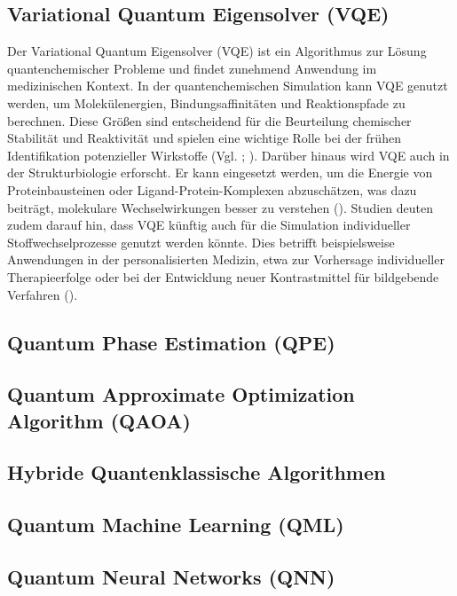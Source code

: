 \subsection{Variational Quantum Eigensolver (VQE)}
Der Variational Quantum Eigensolver (VQE) ist ein Algorithmus zur Lösung quantenchemischer Probleme und findet zunehmend Anwendung im medizinischen Kontext. In der quantenchemischen Simulation kann VQE genutzt werden, um Molekülenergien, Bindungsaffinitäten und Reaktionspfade zu berechnen. Diese Größen sind entscheidend für die Beurteilung chemischer Stabilität und Reaktivität und spielen eine wichtige Rolle bei der frühen Identifikation potenzieller Wirkstoffe (Vgl. \cite{palFuturePotentialQuantum2024}; \cite{cao_quantum_2019}). Darüber hinaus wird VQE auch in der Strukturbiologie erforscht. Er kann eingesetzt werden, um die Energie von Proteinbausteinen oder Ligand-Protein-Komplexen abzuschätzen, was dazu beiträgt, molekulare Wechselwirkungen besser zu verstehen (\cite{marchettiQuantumComputingAlgorithms2022}). Studien deuten zudem darauf hin, dass VQE künftig auch für die Simulation individueller Stoffwechselprozesse genutzt werden könnte. Dies betrifft beispielsweise Anwendungen in der personalisierten Medizin, etwa zur Vorhersage individueller Therapieerfolge oder bei der Entwicklung neuer Kontrastmittel für bildgebende Verfahren (\cite{palFuturePotentialQuantum2024}).

\subsection{Quantum Phase Estimation (QPE)}

\subsection{Quantum Approximate Optimization Algorithm (QAOA)}

\subsection{Hybride Quantenklassische Algorithmen}

\subsection{Quantum Machine Learning (QML)}

\subsection{Quantum Neural Networks (QNN)}

